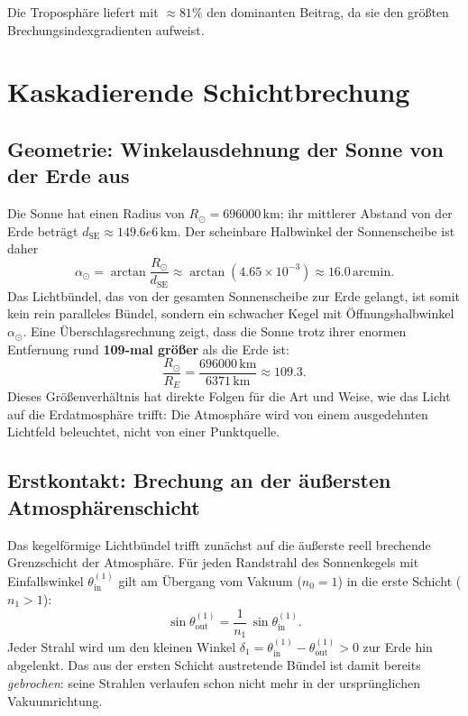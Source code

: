 \documentclass[12pt,a4paper]{article}
\providecommand{\SI}[2]{\ensuremath{#1\,#2}}
\providecommand{\ang}[1]{\ensuremath{#1\,\mathrm{arcmin}}}
\providecommand{\kilo}{\mathrm{k}}
\providecommand{\metre}{\mathrm{m}}
\begin{document}
Die Troposphäre liefert mit $\approx 81\%$ den dominanten Beitrag,
da sie den größten Brechungsindexgradienten aufweist.

\section{Kaskadierende Schichtbrechung}
\label{sec:kaskade}

\subsection{Geometrie: Winkelausdehnung der Sonne von der Erde aus}

Die Sonne hat einen Radius von $R_\odot = \SI{696000}{\kilo\metre}$;
ihr mittlerer Abstand von der Erde beträgt
$d_{\mathrm{SE}} \approx \SI{149.6e6}{\kilo\metre}$.
Der scheinbare Halbwinkel der Sonnenscheibe ist daher
\begin{equation}
  \alpha_\odot = \arctan\!\frac{R_\odot}{d_{\mathrm{SE}}}
               \approx \arctan(4.65\times 10^{-3})
               \approx \ang{16.0}.
  \label{eq:alpha_sonne}
\end{equation}
Das Lichtbündel, das von der gesamten Sonnenscheibe zur Erde gelangt,
ist somit kein rein paralleles Bündel, sondern ein schwacher
Kegel mit Öffnungshalbwinkel $\alpha_\odot$.
Eine Überschlagsrechnung zeigt, dass die Sonne trotz ihrer enormen
Entfernung rund \textbf{109-mal größer} als die Erde ist:
\begin{equation}
  \frac{R_\odot}{R_E} = \frac{\SI{696000}{\kilo\metre}}{\SI{6371}{\kilo\metre}}
                       \approx 109.3.
  \label{eq:sonne_erde_groesse}
\end{equation}
Dieses Größenverhältnis hat direkte Folgen für die Art und Weise,
wie das Licht auf die Erdatmosphäre trifft:
Die Atmosphäre wird von einem ausgedehnten Lichtfeld beleuchtet,
nicht von einer Punktquelle.

\subsection{Erstkontakt: Brechung an der äußersten Atmosphärenschicht}

Das kegelförmige Lichtbündel trifft zunächst auf die äußerste
reell brechende Grenzschicht der Atmosphäre.
Für jeden Randstrahl des Sonnenkegels mit Einfallswinkel
$\theta_{\mathrm{in}}^{(1)}$ gilt am Übergang vom Vakuum
($n_0 = 1$) in die erste Schicht ($n_1 > 1$):
\begin{equation}
  \sin\theta_{\mathrm{out}}^{(1)} = \frac{1}{n_1}\,\sin\theta_{\mathrm{in}}^{(1)}.
  \label{eq:snell_schicht1}
\end{equation}
Jeder Strahl wird um den kleinen Winkel
$\delta_1 = \theta_{\mathrm{in}}^{(1)} - \theta_{\mathrm{out}}^{(1)} > 0$
zur Erde hin abgelenkt.
Das aus der ersten Schicht austretende Bündel ist damit bereits
\emph{gebrochen}: seine Strahlen verlaufen schon nicht mehr in der
ursprünglichen Vakuumrichtung.
\end{document}
